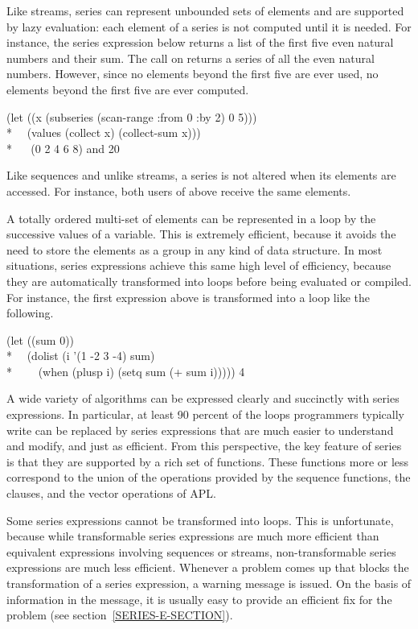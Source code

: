 Like streams, series can represent unbounded sets of elements and are
supported by lazy evaluation: each element of a series is not
computed until it is needed.  For instance, the series expression below
returns a list of the first five even natural numbers and their sum.  The
call on  returns a series of all the even natural numbers.
However, since no elements beyond the first five are ever used, no elements
beyond the first five are ever computed.
\begin{lisp}
(let ((x (subseries (scan-range :from 0 :by 2) 0 5))) \\*
~~(values (collect x) (collect-sum x))) \\*
~~{\EV} (0 2 4 6 8) {\rm and} 20
\end{lisp}

Like sequences and unlike streams, a series is not altered
when its elements are accessed.  For instance, both users of 
above receive the same elements.

A totally ordered multi-set of elements can be represented in a loop by the
successive values of a variable.  This is extremely efficient, because it
avoids the need to store the elements as a group in any kind of data
structure.  In most situations, series expressions achieve this same high
level of efficiency, because they are automatically transformed into loops
before being evaluated or compiled.  For instance, the first expression
above is transformed into a loop like the following.
\begin{lisp}
(let ((sum 0)) \\*
~~(dolist (i '(1 -2  3 -4) sum) \\*
~~~~(when (plusp i) (setq sum (+ sum i))))) {\EV} 4
\end{lisp}

A wide variety of algorithms can be expressed clearly and succinctly with
series expressions.  In particular, at least 90 percent of the loops
programmers typically write can be replaced by series expressions that are
much easier to understand and modify, and just as efficient.   From this
perspective, the key feature of series is that they are supported by a rich
set of functions.  These functions more or less correspond to the union of
the operations provided by the sequence functions, the  clauses,
and the vector operations of APL.

Some series expressions cannot be transformed into loops.
This is unfortunate, because while transformable series expressions are much more
efficient than equivalent expressions involving sequences or streams,
non-transformable series expressions are much less efficient.  Whenever a
problem comes up that blocks the transformation of a series expression, a
warning message is issued.  On the basis of information in the message, it is
usually easy to provide an efficient fix for the problem (see
section~\ref{SERIES-E-SECTION}).

